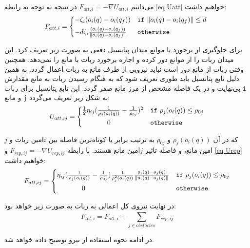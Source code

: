 می‌دانیم $F_{att,i} = -\nabla U_{att,i}$ در نتیجه به توجه به رابطه \ref{eq Uatt} خواهیم داشت:
\begin{equation}
F_{att,i} = 
\begin{cases*}
-\zeta_i(o_i(q) - o_i(q_f)) & \verb|if| $\|o_i(q) - o_i(q_f)\| \le d$ \\
-d\zeta_i \frac{(o_i(q) - o_i(q_f))}{\|o_i(q) - o_i(q_f)\|} & \verb|otherwise|
\end{cases*}
\end{equation}

برای جلوگیری از برخورد با موانع میدان پتانسیل دفعی به صورت زیر تعریف کرد. این میدان ربات را از موانع دور کرده و اجازه برخورد ربات با مانع را نمی‌دهد. همچنین وقتی ربات از مانع دور است نباید نیرویی از طرف مانع به ربات اعمال گردد. به همین دلیل تابع پتانسیل باید طوری تعریف شود که به هنگام رسیدن ربات به مانع مقدارش بی‌نهایت و در یک فاصله مشخص از مرز مانع صفر گردد. این تابع پتانسیل برای ربات \verb|i| و مانع \verb|j| به شکل زیر تعریف می‌گردد:
\begin{equation}\label{eq Urep}
U_{att,ij} = 
\begin{cases*}
\frac{1}{2}\eta_{ij}(\frac{1}{\rho_j(o_i(q))} - \frac{1}{\rho_{0j}})^2 & \verb|if| $\rho_j(o_i(q)) \le \rho_{0j}$\\
~~~~~~~~~~~0 & \verb|otherwise|
\end{cases*}
\end{equation}

که در آن $\rho_j(o_i(q))$ و $\rho_{0j}$ به ترتیب برابر یا کوتاه‌ترین فاصله بین $i$امین ربات و $j$امین مانع، و فاصله تاثیر $j$امین مانع هستند. با رابطه $F_{rep,ij} = -\nabla U_{rep,ij}$ و \ref{eq Urep} خواهیم داشت:
\begin{equation}\label{eq Frep}
F_{att,ij} = 
\begin{cases*}
\eta_{ij}(\frac{1}{\rho_j(o_i(q))} - \frac{1}{\rho_{0j}}) \frac{1}{\rho^2_j(o_i(q))} \frac{o_i(q)-o_j(q)}{\|o_i(q)-o_j(q)\|} & \verb|if| $\rho_j(o_i(q)) \le \rho_{0j}$\\
~~~~~~~~~~~0 & \verb|otherwise|
\end{cases*}
\end{equation}

در نهایت نیروی کل اعمالی به ربات به صورت زیر خواهد بود:
\begin{equation}\label{eq Ftot}
	F_{tot,i} = F_{att,i} + \sum_{j \in obstacles}^{}F_{rep,ij}
\end{equation}

در ادامه نحوه استفاده از نیرو توضیح داده خواهد شد.

